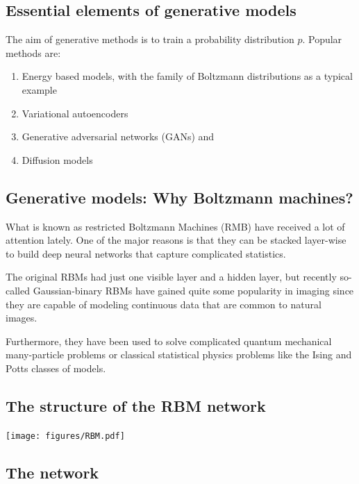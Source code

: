 \documentclass[%
oneside,                 %
final,                   %
10pt]{article}
\begin{document}
\subsection{Essential elements of generative models}

The aim of generative methods is to train a probability distribution $p$. Popular methods are:
\begin{enumerate}
\item Energy based models, with the family of Boltzmann distributions as a typical example

\item Variational autoencoders

\item Generative adversarial networks (GANs) and

\item Diffusion models
\end{enumerate}

\noindent
\subsection{Generative models: Why Boltzmann machines?}

What is known as restricted Boltzmann Machines (RMB) have received a
lot of attention lately.  One of the major reasons is that they can be
stacked layer-wise to build deep neural networks that capture
complicated statistics.

The original RBMs had just one visible layer and a hidden layer, but
recently so-called Gaussian-binary RBMs have gained quite some
popularity in imaging since they are capable of modeling continuous
data that are common to natural images.

Furthermore, they have been used to solve complicated quantum
mechanical many-particle problems or classical statistical physics
problems like the Ising and Potts classes of models.

\subsection{The structure of the RBM network}

\vspace{6mm}

\centerline{\texttt{[image: figures/RBM.pdf]}}

\vspace{6mm}

\subsection{The network}
\end{document}
